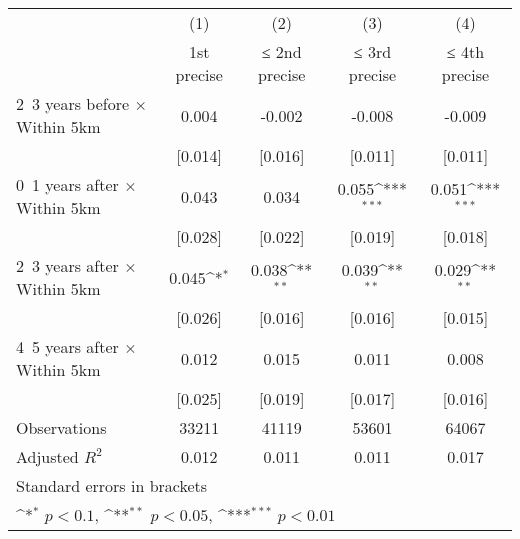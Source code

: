 {
\def\sym#1{\ifmmode^{#1}\else\(^{#1}\)\fi}
\begin{tabular}{l*{4}{c}}
\hline\hline
                    &\multicolumn{1}{c}{(1)}&\multicolumn{1}{c}{(2)}&\multicolumn{1}{c}{(3)}&\multicolumn{1}{c}{(4)}\\
                    &\multicolumn{1}{c}{1st precise}&\multicolumn{1}{c}{≤ 2nd precise}&\multicolumn{1}{c}{≤ 3rd precise}&\multicolumn{1}{c}{≤ 4th precise}\\
\hline
2~3 years before × Within 5km&       0.004         &      -0.002         &      -0.008         &      -0.009         \\
                    &     [0.014]         &     [0.016]         &     [0.011]         &     [0.011]         \\
0~1 years after × Within 5km&       0.043         &       0.034         &       0.055\sym{***}&       0.051\sym{***}\\
                    &     [0.028]         &     [0.022]         &     [0.019]         &     [0.018]         \\
2~3 years after × Within 5km&       0.045\sym{*}  &       0.038\sym{**} &       0.039\sym{**} &       0.029\sym{**} \\
                    &     [0.026]         &     [0.016]         &     [0.016]         &     [0.015]         \\
4~5 years after × Within 5km&       0.012         &       0.015         &       0.011         &       0.008         \\
                    &     [0.025]         &     [0.019]         &     [0.017]         &     [0.016]         \\
\hline
Observations        &       33211         &       41119         &       53601         &       64067         \\
Adjusted \(R^{2}\)  &       0.012         &       0.011         &       0.011         &       0.017         \\
\hline\hline
\multicolumn{5}{l}{\footnotesize Standard errors in brackets}\\
\multicolumn{5}{l}{\footnotesize \sym{*} \(p<0.1\), \sym{**} \(p<0.05\), \sym{***} \(p<0.01\)}\\
\end{tabular}
}
